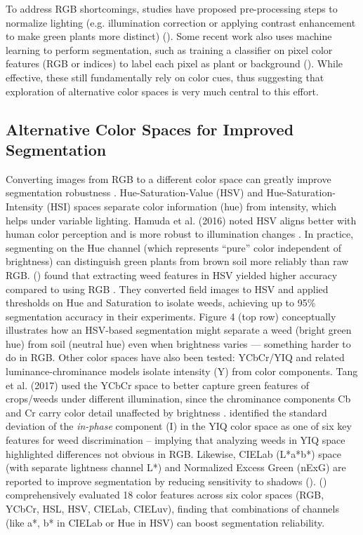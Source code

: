 \documentclass[letterpaper, notitlepage]{report}
\begin{document}
%
To address RGB shortcomings, studies have proposed pre-processing steps to normalize lighting (e.g. illumination correction or applying contrast enhancement to make green plants more distinct) (\cite{Lu2022-rq}). Some recent work also uses machine learning to perform segmentation, such as training a classifier on pixel color features (RGB or indices) to label each pixel as plant or background (\cite{Gee2020-cz}). While effective, these still fundamentally rely on color cues, thus suggesting that exploration of alternative color spaces is very much central to this effort.
%

\subsection{Alternative Color Spaces  for Improved Segmentation}  
Converting images from RGB to a different color space can greatly improve segmentation robustness \parencite{Khattab2014-eu}. Hue-Saturation-Value (HSV) and Hue-Saturation-Intensity (HSI) spaces separate color information (hue) from intensity, which helps under variable lighting. Hamuda et al. (2016) noted HSV aligns better with human color perception and is more robust to illumination changes \parencite{Hamuda2017-nf}. In practice, segmenting on the Hue channel (which represents “pure” color independent of brightness) can distinguish green plants from brown soil more reliably than raw RGB. \citeauthor{Priya2019-zw} (\citeyear{Priya2019-zw}) found that extracting weed features in HSV yielded higher accuracy compared to using RGB \parencite{Priya2019-zw}. They converted field images to HSV and applied thresholds on Hue and Saturation to isolate weeds, achieving up to 95\% segmentation accuracy in their experiments. Figure 4 (top row) conceptually illustrates how an HSV-based segmentation might separate a weed (bright green hue) from soil (neutral hue) even when brightness varies --- something harder to do in RGB. 
%
Other color spaces have also been tested: YCbCr/YIQ and related luminance-chrominance models isolate intensity (Y) from color components. Tang et al. (2017) used the YCbCr space to better capture green features of crops/weeds under different illumination, since the chrominance components Cb and Cr carry color detail unaffected by brightness \parencite{Wu2021-gt}. \citeauthor{Sabzi2020-af} identified the standard deviation of the \textit{in-phase} component (I) in the YIQ color space as one of six key features for weed discrimination \parencite{Sabzi2020-af} – implying that analyzing weeds in YIQ space highlighted differences not obvious in RGB. Likewise, CIELab (L*a*b*) space (with separate lightness channel L*) and Normalized Excess Green (nExG) are reported to improve segmentation by reducing sensitivity to shadows (\parencite{Wu2021-gt}). \citeauthor{Guo2013-eq} (\citeyear{Guo2013-eq}) comprehensively evaluated 18 color features across six color spaces (RGB, YCbCr, HSL, HSV, CIELab, CIELuv), finding that combinations of channels (like a*, b* in CIELab or Hue in HSV) can boost segmentation reliability.  
\end{document}
